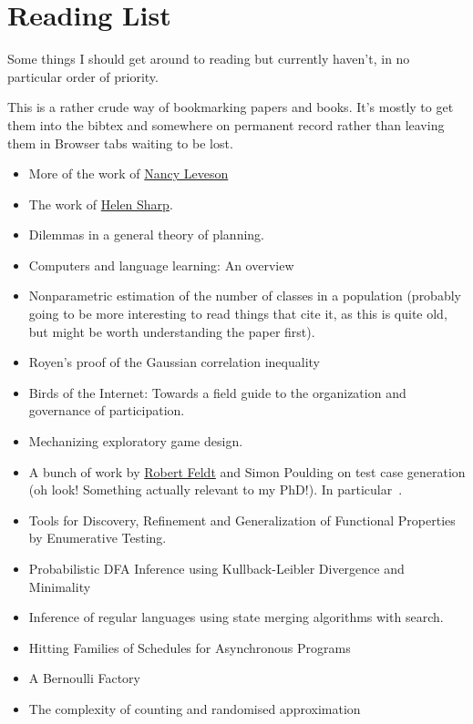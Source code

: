 \chapter{Reading List}

Some things I should get around to reading but currently haven't,
in no particular order of priority.

This is a rather crude way of bookmarking papers and books.
It's mostly to get them into the bibtex and somewhere on permanent record rather than leaving them in Browser tabs waiting to be lost.


\begin{itemize}
\item More of the work of \href{http://sunnyday.mit.edu/papers.html}{Nancy Leveson}
\item The work of \href{http://mcs.open.ac.uk/hcs2/}{Helen Sharp}.
\item Dilemmas in a general theory of planning\cite{rittel1973dilemmas}.
\item Computers and language learning: An overview\cite{warschauer1998computers}
\item Nonparametric estimation of the number of classes in a population\cite{chao1984nonparametric} (probably going to be more interesting to read things that cite it, as this is quite old, but might be worth understanding the paper first).
\item Royen’s proof of the Gaussian correlation inequality\cite{latala2017royen}
\item Birds of the Internet: Towards a field guide to the organization and governance of participation\cite{fish2011birds}.
\item Mechanizing exploratory game design\cite{smith2012mechanizing}.
\item A bunch of work by \href{http://www.robertfeldt.net/}{Robert Feldt} and Simon Poulding on test case generation
(oh look! Something actually relevant to my PhD!).
In particular~\cite{DBLP:conf/icst/PouldingF15, DBLP:conf/issre/FeldtP13, DBLP:conf/icse/FeldtP15}.
\item Tools for Discovery, Refinement and Generalization of Functional Properties by Enumerative Testing\cite{matela2017tools}.
\item Probabilistic DFA Inference using Kullback-Leibler Divergence and Minimality\cite{DBLP:conf/icml/ThollardDH00}
\item Inference of regular languages using state merging algorithms with search\cite{DBLP:journals/pr/BugalhoO05}.
\item Hitting Families of Schedules for Asynchronous Programs\cite{DBLP:conf/cav/ChistikovMN16}
\item A Bernoulli Factory\cite{DBLP:journals/tomacs/KeaneO94}
\item The complexity of counting and randomised approximation\cite{bordewich2003complexity}
\end{itemize}

